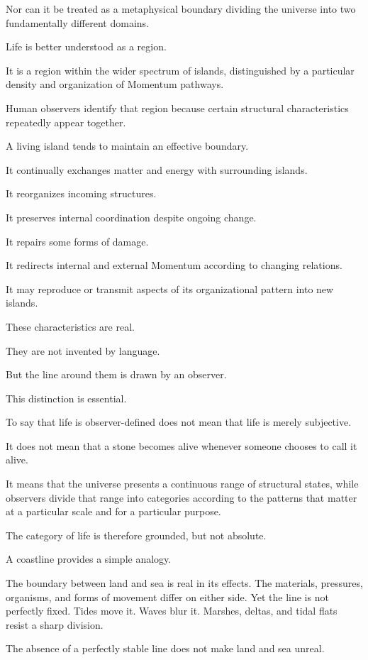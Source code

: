 Nor can it be treated as a metaphysical boundary dividing the universe into two fundamentally different domains.

Life is better understood as a region.

It is a region within the wider spectrum of islands, distinguished by a particular density and organization of Momentum pathways.

Human observers identify that region because certain structural characteristics repeatedly appear together.

A living island tends to maintain an effective boundary.

It continually exchanges matter and energy with surrounding islands.

It reorganizes incoming structures.

It preserves internal coordination despite ongoing change.

It repairs some forms of damage.

It redirects internal and external Momentum according to changing relations.

It may reproduce or transmit aspects of its organizational pattern into new islands.

These characteristics are real.

They are not invented by language.

But the line around them is drawn by an observer.

This distinction is essential.

To say that life is observer-defined does not mean that life is merely subjective.

It does not mean that a stone becomes alive whenever someone chooses to call it alive.

It means that the universe presents a continuous range of structural states, while observers divide that range into categories according to the patterns that matter at a particular scale and for a particular purpose.

The category of life is therefore grounded, but not absolute.

A coastline provides a simple analogy.

The boundary between land and sea is real in its effects. The materials, pressures, organisms, and forms of movement differ on either side. Yet the line is not perfectly fixed. Tides move it. Waves blur it. Marshes, deltas, and tidal flats resist a sharp division.

The absence of a perfectly stable line does not make land and sea unreal.

